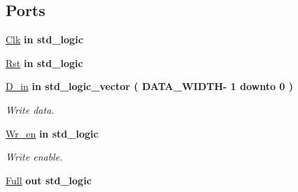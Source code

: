 \subsection*{Ports}
 \begin{DoxyCompactItemize}
\item 
\hyperlink{classfifo_af9ed3b7199b4ea3c9ec36241cbcd1814}{Clk}  {\bfseries {\bfseries \textcolor{keywordflow}{in}\textcolor{vhdlchar}{ }}} {\bfseries \textcolor{comment}{std\+\_\+logic}\textcolor{vhdlchar}{ }} \hypertarget{classfifo_af9ed3b7199b4ea3c9ec36241cbcd1814}{}\label{classfifo_af9ed3b7199b4ea3c9ec36241cbcd1814}

\item 
\hyperlink{classfifo_ab49193888075c9174261496217782118}{Rst}  {\bfseries {\bfseries \textcolor{keywordflow}{in}\textcolor{vhdlchar}{ }}} {\bfseries \textcolor{comment}{std\+\_\+logic}\textcolor{vhdlchar}{ }} \hypertarget{classfifo_ab49193888075c9174261496217782118}{}\label{classfifo_ab49193888075c9174261496217782118}

\item 
\hyperlink{classfifo_a3745f1e042578ba3d82b3eddc008f71b}{D\+\_\+in}  {\bfseries {\bfseries \textcolor{keywordflow}{in}\textcolor{vhdlchar}{ }}} {\bfseries \textcolor{comment}{std\+\_\+logic\+\_\+vector}\textcolor{vhdlchar}{ }\textcolor{vhdlchar}{(}\textcolor{vhdlchar}{ }\textcolor{vhdlchar}{ }\textcolor{vhdlchar}{ }\textcolor{vhdlchar}{ }\textcolor{vhdlchar}{D\+A\+T\+A\+\_\+\+W\+I\+D\+TH}\textcolor{vhdlchar}{-\/}\textcolor{vhdlchar}{ } \textcolor{vhdldigit}{1} \textcolor{vhdlchar}{ }\textcolor{keywordflow}{downto}\textcolor{vhdlchar}{ }\textcolor{vhdlchar}{ } \textcolor{vhdldigit}{0} \textcolor{vhdlchar}{ }\textcolor{vhdlchar}{)}\textcolor{vhdlchar}{ }} \hypertarget{classfifo_a3745f1e042578ba3d82b3eddc008f71b}{}\label{classfifo_a3745f1e042578ba3d82b3eddc008f71b}

\begin{DoxyCompactList}\small\item\em Write data. \end{DoxyCompactList}\item 
\hyperlink{classfifo_a995bed96a9d72d967482de7e6b68638b}{Wr\+\_\+en}  {\bfseries {\bfseries \textcolor{keywordflow}{in}\textcolor{vhdlchar}{ }}} {\bfseries \textcolor{comment}{std\+\_\+logic}\textcolor{vhdlchar}{ }} \hypertarget{classfifo_a995bed96a9d72d967482de7e6b68638b}{}\label{classfifo_a995bed96a9d72d967482de7e6b68638b}

\begin{DoxyCompactList}\small\item\em Write enable. \end{DoxyCompactList}\item 
\hyperlink{classfifo_ab34420ff9d80f2a18afef9189c31e9c0}{Full}  {\bfseries {\bfseries \textcolor{keywordflow}{out}\textcolor{vhdlchar}{ }}} {\bfseries \textcolor{comment}{std\+\_\+logic}\textcolor{vhdlchar}{ }} \hypertarget{classfifo_ab34420ff9d80f2a18afef9189c31e9c0}{}\label{classfifo_ab34420ff9d80f2a18afef9189c31e9c0}


\end{DoxyCompactItemize}
